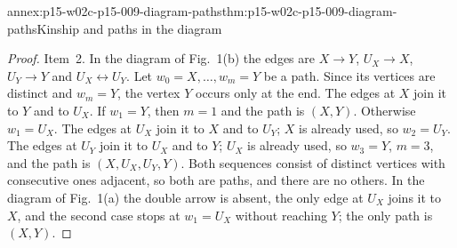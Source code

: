 \begin{annexitem}{annex:p15-w02c-p15-009-diagram-paths}{thm:p15-w02c-p15-009-diagram-paths}{Kinship and paths in the diagram}
\begin{proof}
Item~2. In the diagram of Fig.~1(b) the edges are \(X\to Y\),
\(U_X\to X\), \(U_Y\to Y\) and \(U_X\leftrightarrow U_Y\). Let
\(w_0=X,\ldots,w_m=Y\) be a path. Since its vertices are distinct and
\(w_m=Y\), the vertex \(Y\) occurs only at the end. The edges at \(X\)
join it to \(Y\) and to \(U_X\). If \(w_1=Y\), then \(m=1\) and the path
is \((X,Y)\). Otherwise \(w_1=U_X\). The edges at \(U_X\) join it to
\(X\) and to \(U_Y\); \(X\) is already used, so \(w_2=U_Y\). The edges at
\(U_Y\) join it to \(U_X\) and to \(Y\); \(U_X\) is already used, so
\(w_3=Y\), \(m=3\), and the path is \((X,U_X,U_Y,Y)\). Both sequences
consist of distinct vertices with consecutive ones adjacent, so both are
paths, and there are no others. In the diagram of Fig.~1(a) the double
arrow is absent, the only edge at \(U_X\) joins it to \(X\), and the
second case stops at \(w_1=U_X\) without reaching \(Y\); the only path is
\((X,Y)\).
\end{proof}
\end{annexitem}

